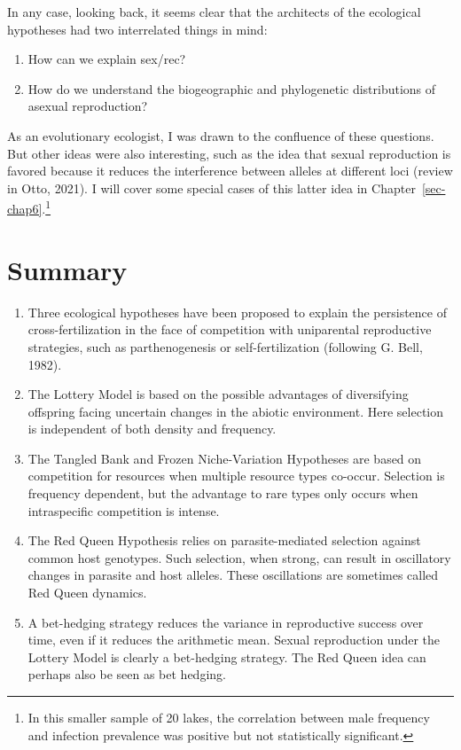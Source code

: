 \documentclass[
  letterpaper,
]{book}
\providecommand{\tightlist}{%
  \setlength{\itemsep}{0pt}\setlength{\parskip}{0pt}}\usepackage{longtable,booktabs,array}
\begin{document}
In any case, looking back, it seems clear that the architects of the
ecological hypotheses had two interrelated things in mind:

\begin{enumerate}
\def\labelenumi{\arabic{enumi}.}
\tightlist
\item
  How can we explain sex/rec?
\item
  How do we understand the biogeographic and phylogenetic distributions
  of asexual reproduction?
\end{enumerate}

As an evolutionary ecologist, I was drawn to the confluence of these
questions. But other ideas were also interesting, such as the idea that
sexual reproduction is favored because it reduces the interference
between alleles at different loci (review in Otto, 2021). I will cover
some special cases of this latter idea in
Chapter~\ref{sec-chap6}.\footnote{In this smaller sample of 20 lakes,
  the correlation between male frequency and infection prevalence was
  positive but not statistically significant.}

\hypertarget{summary-1}{%
\section{Summary}\label{summary-1}}

\begin{enumerate}
\def\labelenumi{\arabic{enumi}.}
\item
  Three ecological hypotheses have been proposed to explain the
  persistence of cross-fertilization in the face of competition with
  uniparental reproductive strategies, such as parthenogenesis or
  self-fertilization (following G. Bell, 1982).
\item
  The Lottery Model is based on the possible advantages of diversifying
  offspring facing uncertain changes in the abiotic environment. Here
  selection is independent of both density and frequency.
\item
  The Tangled Bank and Frozen Niche-Variation Hypotheses are based on
  competition for resources when multiple resource types co-occur.
  Selection is frequency dependent, but the advantage to rare types only
  occurs when intraspecific competition is intense.
\item
  The Red Queen Hypothesis relies on parasite-mediated selection against
  common host genotypes. Such selection, when strong, can result in
  oscillatory changes in parasite and host alleles. These oscillations
  are sometimes called Red Queen dynamics.
\item
  A bet-hedging strategy reduces the variance in reproductive success
  over time, even if it reduces the arithmetic mean. Sexual reproduction
  under the Lottery Model is clearly a bet-hedging strategy. The Red
  Queen idea can perhaps also be seen as bet hedging.
\end{enumerate}
\end{document}
